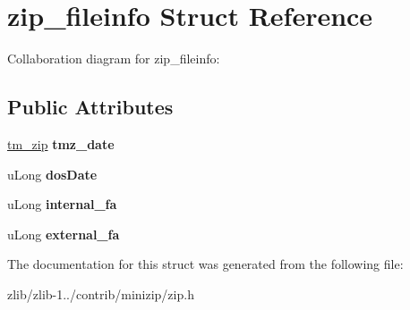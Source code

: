 \hypertarget{structzip__fileinfo}{\section{zip\+\_\+fileinfo Struct Reference}
\label{structzip__fileinfo}
}


Collaboration diagram for zip\+\_\+fileinfo\+:
\subsection*{Public Attributes}
\begin{DoxyCompactItemize}
\item 
\hypertarget{structzip__fileinfo_ae09a694a598b7507d23705764c9e46fb}{\hyperlink{structtm__zip__s}{tm\+\_\+zip} {\bfseries tmz\+\_\+date}}\label{structzip__fileinfo_ae09a694a598b7507d23705764c9e46fb}

\item 
\hypertarget{structzip__fileinfo_a0541c57e59450fbc17b2f898ca4bc9e8}{u\+Long {\bfseries dos\+Date}}\label{structzip__fileinfo_a0541c57e59450fbc17b2f898ca4bc9e8}

\item 
\hypertarget{structzip__fileinfo_a396175a434b86115ce5600ab1dbb1644}{u\+Long {\bfseries internal\+\_\+fa}}\label{structzip__fileinfo_a396175a434b86115ce5600ab1dbb1644}

\item 
\hypertarget{structzip__fileinfo_ac0be78ded330ffd46815bafc5b6b37bb}{u\+Long {\bfseries external\+\_\+fa}}\label{structzip__fileinfo_ac0be78ded330ffd46815bafc5b6b37bb}

\end{DoxyCompactItemize}


The documentation for this struct was generated from the following file\+:\begin{DoxyCompactItemize}
\item 
zlib/zlib-\/1../contrib/minizip/zip.\+h\end{DoxyCompactItemize}

